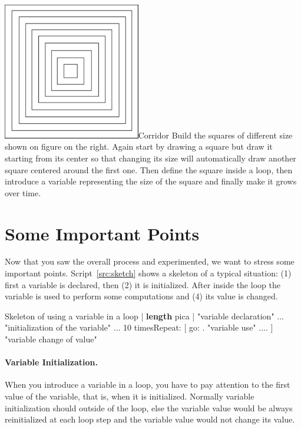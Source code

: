 \begin{exofigwithsizeandtitle}[0.5]{\includegraphics[width=6cm]{corridor}}{Corridor}\label{exo:corridorsimple}
Build the squares of different size shown on figure on the right.
Again start by drawing a square but draw it starting from its center so that changing its size will automatically draw another square centered around the first one. Then define the square inside a loop, then introduce a variable representing the size of the square and finally make it grows over time.
\end{exofigwithsizeandtitle}



\section{Some Important Points}
Now that you saw the overall process and experimented, we want to stress some 
important points. Script~\ref{src:sketch} shows a skeleton of a typical situation: (1) first a variable is declared, then (2)  it is initialized. After inside the loop the variable is used to perform some computations and (4) its value is changed. 

\begin{scriptwithtitle}{Skeleton of using a variable in a loop}\label{src:sketch}
| \textbf{length} pica |                                      "variable declaration"
...
                                       "initialization of the variable"
...
10 timesRepeat: 
               [ \caro go: .                  "variable use"
               ....
                ]        "variable change of value"
\end{scriptwithtitle}


\paragraph{Variable Initialization.} When you introduce a variable in a loop, you have to pay attention to the first value of the variable, that is, when it is initialized. Normally variable initialization should outside of the loop, else the variable value would be always reinitialized at each loop step and the variable value would not change its value. 


